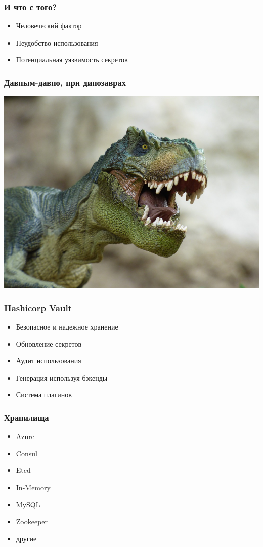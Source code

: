 \documentclass[mathserif,serif]{beamer}
\begin{document}
\begin{frame}
	\frametitle{И что с того?}
	\begin{itemize}
		\item{Человеческий фактор}
		\item{Неудобство использования}
		\item{Потенциальная уязвимость секретов}
	\end{itemize}
\end{frame}

\begin{frame}
	\frametitle{Давным-давно, при динозаврах}
	\includegraphics[width=\linewidth]{dino.jpg}
\end{frame}

\begin{frame}
	\frametitle{Hashicorp Vault}
	\begin{itemize}
		\item{Безопасное и надежное хранение}
		\item{Обновление секретов}
		\item{Аудит использования}
		\item{Генерация используя бэкенды}
		\item{Система плагинов}
	\end{itemize}
\end{frame}

\begin{frame}
	\frametitle{Хранилища}
	\begin{itemize}
		\item{Azure}
		\item{Consul}
		\item{Etcd}
		\item{In-Memory}
		\item{MySQL}
		\item{Zookeeper}
		\item{другие}
	\end{itemize}
\end{frame}
\end{document}
